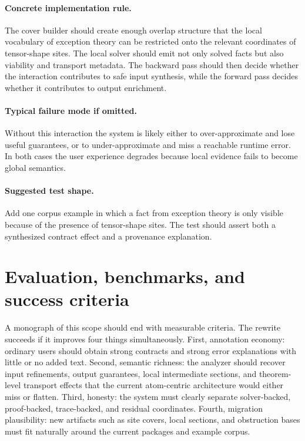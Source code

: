 \documentclass[11pt]{report}
\theoremstyle{definition}
\theoremstyle{plain}
\begin{document}
\paragraph{Concrete implementation rule.}
The cover builder should create enough overlap structure that the local
vocabulary of exception theory can be restricted onto the relevant
coordinates of tensor-shape sites. The local solver should emit not only
solved facts but also viability and transport metadata. The backward pass
should then decide whether the interaction contributes to safe input
synthesis, while the forward pass decides whether it contributes to output
enrichment.

\paragraph{Typical failure mode if omitted.}
Without this interaction the system is likely either to over-approximate and
lose useful guarantees, or to under-approximate and miss a reachable runtime
error. In both cases the user experience degrades because local evidence
fails to become global semantics.

\paragraph{Suggested test shape.}
Add one corpus example in which a fact from exception theory is only
visible because of the presence of tensor-shape sites. The test should
assert both a synthesized contract effect and a provenance explanation.


\section{Evaluation, benchmarks, and success criteria}

A monograph of this scope should end with measurable criteria. The rewrite
succeeds if it improves four things simultaneously. First, annotation economy:
ordinary users should obtain strong contracts and strong error explanations with
little or no added text. Second, semantic richness: the analyzer should recover
input refinements, output guarantees, local intermediate sections, and theorem-
level transport effects that the current atom-centric architecture would either
miss or flatten. Third, honesty: the system must clearly separate solver-backed,
proof-backed, trace-backed, and residual coordinates. Fourth, migration
plausibility: new artifacts such as site covers, local sections, and obstruction
bases must fit naturally around the current packages and example corpus.
\end{document}
